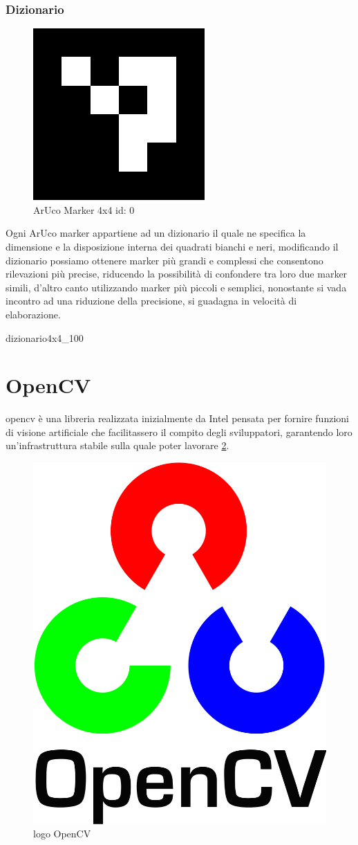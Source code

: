 \documentclass[12pt,a4paper,openright,twoside]{book}
\begin{document}
\subsubsection{Dizionario} \label{subsubsec:dizionario}
\begin{figure}[h!]
	\centering
	\includegraphics[width=0.5\linewidth]{./figures/4x4_1000-0.png}
	\caption{ArUco Marker 4x4 id: 0}
	\label{fig:aruco_marker_0}
\end{figure}
Ogni ArUco marker appartiene ad un dizionario il quale ne specifica la dimensione e la disposizione interna dei quadrati bianchi e neri, modificando il dizionario possiamo ottenere marker più grandi e complessi che consentono rilevazioni più precise, riducendo la possibilità di confondere tra loro due marker simili, d'altro canto utilizzando marker più piccoli e semplici, nonostante si vada incontro ad una riduzione della precisione, si guadagna in velocità di elaborazione. \cite{reverseEngineeringArucoMarkers}
 
\begin{center}
	\gls{dizionario4x4_100}
\end{center}

\section{OpenCV} \label{sec:opencv}
\acrfull{opencv} è una libreria realizzata inizialmente da Intel pensata per fornire funzioni di visione artificiale che facilitassero il compito degli sviluppatori, garantendo loro un'infrastruttura stabile sulla quale poter lavorare \ref{fig:opencvLogo}.
\begin{figure}[h!]
	\centering
	\includegraphics[width=0.3\linewidth]{figures/opencvLogo.png}
	\caption{logo OpenCV}
	\label{fig:opencvLogo}
\end{figure}
\end{document}
